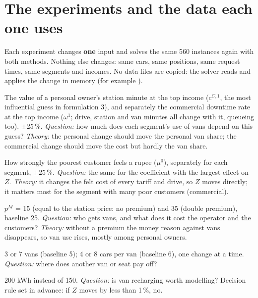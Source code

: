 
\section{The experiments and the data each one uses}
\label{sec:experiments}

Each experiment changes \textbf{one} input and solves the same 560 instances again with both methods. Nothing else changes: same cars, same positions, same request times, same segments and incomes. No data files are copied: the solver reads  and applies the change in memory (for example ).

\begin{table}[H]
\centering
\caption{The 15 variants of the five experiments.}

\end{table}

\begin{description}[leftmargin=1em]
  \item[E5 Value of charging time.] The value of a personal owner's station minute at the top income ($c^{C,1}$, the most influential guess in formulation 3), and separately the commercial downtime rate at the top income ($\omega^1$; drive, station and van minutes all change with it, queueing too). $\pm25$\,\%. \emph{Question:} how much does each segment's use of vans depend on this guess? \emph{Theory:} the personal change should move the personal van share; the commercial change should move the cost but hardly the van share.
  \item[E6 Money sensitivity.] How strongly the poorest customer feels a rupee ($\mu^0$), separately for each segment, $\pm25$\,\%. \emph{Question:} the same for the coefficient with the largest effect on $Z$. \emph{Theory:} it changes the felt cost of every tariff and drive, so $Z$ moves directly; it matters most for the segment with many poor customers (commercial).
  \item[E1 Van tariff.] $p^M$ = 15 (equal to the station price: no premium) and 35 (double premium), baseline 25. \emph{Question:} who gets vans, and what does it cost the operator and the customers? \emph{Theory:} without a premium the money reason against vans disappears, so van use rises, mostly among personal owners.
  \item[E2 Van fleet and seats.] 3 or 7 vans (baseline 5); 4 or 8 cars per van (baseline 6), one change at a time. \emph{Question:} where does another van or seat pay off?
  \item[E8 Van battery.] 200 kWh instead of 150. \emph{Question:} is van recharging worth modelling? Decision rule set in advance: if $Z$ moves by less than 1\,\%, no.
\end{description}

